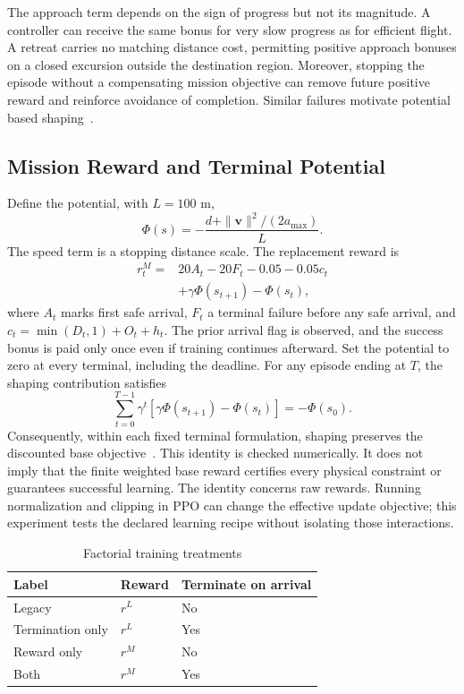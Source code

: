 \documentclass[conference]{IEEEtran}
\begin{document}
The approach term depends on the sign of progress but not its magnitude. A
controller can receive the same bonus for very slow progress as for efficient
flight. A retreat carries no matching distance cost, permitting positive
approach bonuses on a closed excursion outside the destination region.
Moreover, stopping the episode without a compensating mission objective can
remove future positive reward and reinforce avoidance of completion. Similar
failures motivate potential based shaping~\cite{shaping}.

\subsection{Mission Reward and Terminal Potential}
Define the potential, with $L=100$ m,
\begin{equation}
\Phi(s)=-\frac{d+\|\mathbf v\|^2/(2a_{\max})}{L}.
\end{equation}
The speed term is a stopping distance scale. The replacement reward is
\begin{align}
r_t^M={}&20A_t-20F_t-0.05-0.05c_t \nonumber\\
        &+\gamma\Phi(s_{t+1})-\Phi(s_t),
\end{align}
where $A_t$ marks first safe arrival, $F_t$ a terminal failure before any safe
arrival, and $c_t=\min(D_t,1)+O_t+h_t$. The prior arrival flag is observed, and
the success bonus is paid only once even if training continues afterward.
Set the potential to zero at every terminal, including the deadline. For any
episode ending at $T$, the shaping contribution satisfies
\begin{equation}
\sum_{t=0}^{T-1}\gamma^t
 [\gamma\Phi(s_{t+1})-\Phi(s_t)]=-\Phi(s_0).
\end{equation}
Consequently, within each fixed terminal formulation, shaping preserves the
discounted base objective~\cite{shaping}. This identity is checked numerically.
It does not imply that the finite weighted base reward certifies every physical
constraint or guarantees successful learning.
The identity concerns raw rewards. Running normalization and clipping in PPO
can change the effective update objective; this experiment tests the declared
learning recipe without isolating those interactions.

\begin{table}[t]
\caption{Factorial training treatments}
\label{tab:arms}\centering\footnotesize
\begin{tabular}{lll}\toprule
Label & Reward & Terminate on arrival\\\midrule
Legacy & $r^L$ & No\\
Termination only & $r^L$ & Yes\\
Reward only & $r^M$ & No\\
Both & $r^M$ & Yes\\\bottomrule
\end{tabular}
\end{table}
\end{document}
